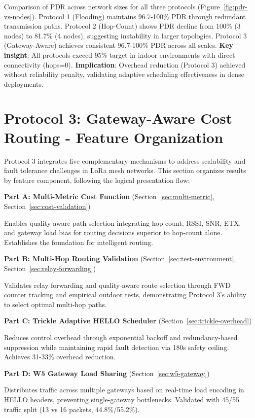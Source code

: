 Comparison of PDR across network sizes for all three protocols (Figure~\ref{fig:pdr-vs-nodes}). Protocol 1 (Flooding) maintains 96.7-100\% PDR through redundant transmission paths. Protocol 2 (Hop-Count) shows PDR decline from 100\% (3 nodes) to 81.7\% (4 nodes), suggesting instability in larger topologies. Protocol 3 (Gateway-Aware) achieves consistent 96.7-100\% PDR across all scales. \textbf{Key insight}: All protocols exceed 95\% target in indoor environments with direct connectivity (hops=0). \textbf{Implication}: Overhead reduction (Protocol 3) achieved without reliability penalty, validating adaptive scheduling effectiveness in dense deployments.

\section{Protocol 3: Gateway-Aware Cost Routing - Feature Organization}

Protocol 3 integrates five complementary mechanisms to address scalability and fault tolerance challenges in LoRa mesh networks. This section organizes results by feature component, following the logical presentation flow:

\textbf{Part A: Multi-Metric Cost Function} (Section~\ref{sec:multi-metric}, Section~\ref{sec:cost-validation})

Enables quality-aware path selection integrating hop count, RSSI, SNR, ETX, and gateway load bias for routing decisions superior to hop-count alone. Establishes the foundation for intelligent routing.

\textbf{Part B: Multi-Hop Routing Validation} (Section~\ref{sec:test-environment}, Section~\ref{sec:relay-forwarding})

Validates relay forwarding and quality-aware route selection through FWD counter tracking and empirical outdoor tests, demonstrating Protocol 3's ability to select optimal multi-hop paths.

\textbf{Part C: Trickle Adaptive HELLO Scheduler} (Section~\ref{sec:trickle-overhead})

Reduces control overhead through exponential backoff and redundancy-based suppression while maintaining rapid fault detection via 180s safety ceiling. Achieves 31-33\% overhead reduction.

\textbf{Part D: W5 Gateway Load Sharing} (Section~\ref{sec:w5-gateway})

Distributes traffic across multiple gateways based on real-time load encoding in HELLO headers, preventing single-gateway bottlenecks. Validated with 45/55 traffic split (13 vs 16 packets, 44.8\%/55.2\%).

